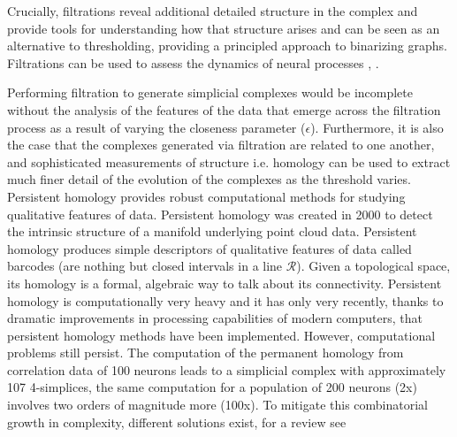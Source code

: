 \documentclass[onecollarge,runningheads]{svjour2}
\begin{document}
Crucially, filtrations reveal additional detailed structure in the complex and provide tools for understanding how that structure arises and can be seen as an alternative to thresholding, providing a principled approach to binarizing graphs. Filtrations can be used to assess the dynamics of neural processes \cite{kim2014morphological},  \cite{giusti2016two}. 

Performing filtration to generate simplicial complexes would be incomplete without the analysis of the features of the data that emerge across the filtration process as a result of varying the closeness parameter ($\epsilon$). Furthermore,  it is also the case that the complexes generated via filtration are related to one another, and sophisticated measurements of structure i.e. homology can be used to extract much finer detail of the evolution of the complexes as the threshold varies. 
Persistent homology provides robust computational methods for studying qualitative features of data. Persistent homology was created in 2000 to detect the intrinsic structure of a manifold underlying point cloud data. Persistent homology produces simple descriptors of qualitative features of data called barcodes (are nothing but closed intervals in a line $\mathcal{R}$). Given a topological space, its homology is a formal, algebraic way to talk about its connectivity. 
Persistent homology is computationally very heavy and it has only very recently, thanks to dramatic improvements in processing capabilities of modern computers, that persistent homology methods have been implemented.
However, computational problems still persist. The computation of the permanent homology from correlation data of 100 neurons leads to a simplicial complex with approximately 107 4-simplices, the same computation for a population of 200 neurons (2x) involves two orders of magnitude more (100x).
To mitigate this combinatorial growth in complexity, different solutions exist, for a review see \cite{otter2015roadmap}

\end{document}
